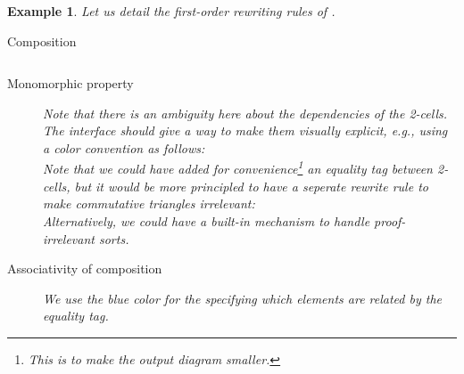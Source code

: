 \documentclass{article}
\newtheorem{example}{Example}[section]
\begin{document}
\begin{example}
    Let us detail the first-order rewriting rules of .

    \begin{description}
        \item[Composition] 
   
\begin{equation}

\label{eq:rew-comp}
\tag{Comp}
\end{equation}

\item[Monomorphic property]
\begin{equation}

\tag{Mono}
\label{eq:rew-mono-fo}
\end{equation}
Note that there is an ambiguity here about the dependencies of the 2-cells. The interface should give a way to make them visually explicit, e.g., using a color convention as follows:
\[

\]
Note that we could have added for convenience\footnote{This is to make the output diagram smaller.} an equality tag between 2-cells, 
but it would be more principled 
to have a seperate rewrite rule  to make commutative triangles irrelevant:
\[

\]
Alternatively, we could have a built-in mechanism to handle proof-irrelevant sorts.
\item[Associativity of composition]
We use the blue color for the specifying which elements 
are related by the equality tag.
\begin{equation}
    
    \label{eq:rew-assoc}
    \tag{Assoc}
    \end{equation}
% 
% 
\end{description}
\end{example}
\end{document}

